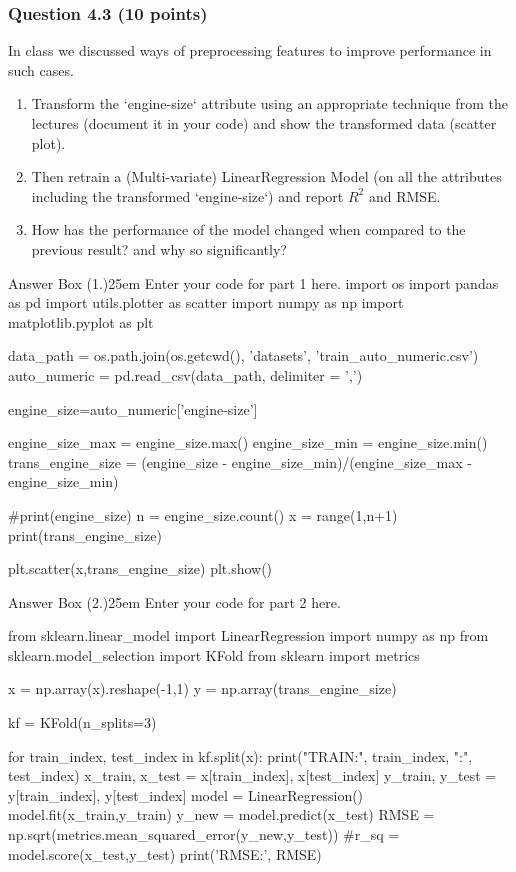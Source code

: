\documentclass[12pt]{article}
\begin{document}
\subsubsection*{Question 4.3 (10 points)}
In class we discussed ways of preprocessing features to improve performance in such cases.
\begin{enumerate}
    \item [1.] [Code] Transform the `engine-size` attribute using an appropriate technique from the lectures (document it in your code) and show the transformed data (scatter plot).
    \item [2.] [Code] Then retrain a (Multi-variate) LinearRegression Model (on all the attributes including the transformed `engine-size`) and report $R^2$ and RMSE. 
    \item [3.] [Text] How has the performance of the model changed when compared to the previous result? and why so significantly?
\end{enumerate}

\begin{code}{Answer Box (1.)}{25em}
    Enter your code for part 1 here.
import os
import pandas as pd
import utils.plotter as scatter
import numpy as np
import matplotlib.pyplot as plt

data_path = os.path.join(os.getcwd(), 'datasets', 'train_auto_numeric.csv')
auto_numeric = pd.read_csv(data_path, delimiter = ',')

engine_size=auto_numeric['engine-size']

engine_size_max = engine_size.max()
engine_size_min = engine_size.min()
trans_engine_size = (engine_size - engine_size_min)/(engine_size_max - engine_size_min)

#print(engine_size)
n = engine_size.count()
x = range(1,n+1)
print(trans_engine_size)

plt.scatter(x,trans_engine_size)
plt.show()

\end{code}


\begin{code}{Answer Box (2.)}{25em}
    Enter your code for part 2 here.
    
from sklearn.linear_model import LinearRegression
import numpy as np
from sklearn.model_selection import KFold
from sklearn import metrics

x = np.array(x).reshape(-1,1)
y = np.array(trans_engine_size)

kf = KFold(n_splits=3)

for train_index, test_index in kf.split(x):
    print("TRAIN:", train_index, "\nTEST:", test_index)
    x_train, x_test = x[train_index], x[test_index]
    y_train, y_test = y[train_index], y[test_index]
    model = LinearRegression()
    model.fit(x_train,y_train)
    y_new = model.predict(x_test)
    RMSE = np.sqrt(metrics.mean_squared_error(y_new,y_test))
    #r_sq = model.score(x_test,y_test)
    print('RMSE:', RMSE)
    
\end{code}
\end{document}
